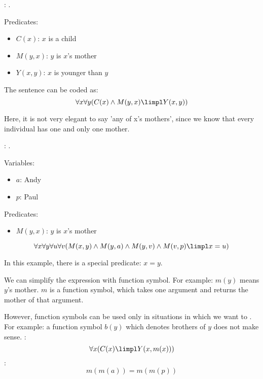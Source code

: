     : .
      \par Predicates:
      \begin{itemize}
        \item $C(x)$: $x$ is a child
        \item $M(y, x)$: $y$ is $x$'s mother
        \item $Y(x, y)$: $x$ is younger than $y$
      \end{itemize}
      \par The sentence can be coded as:
        \[
          \forall x \forall y (C(x) \land M(y, x) \limpl Y(x, y))
        \]
      \par Here, it is not very elegant to say 'any of x’s mothers', since we know that every individual has one and only one mother.

    : .
      \par Variables:
        \begin{itemize}
          \item $a$: Andy
          \item $p$: Paul
        \end{itemize}
      \par Predicates:
        \begin{itemize}
          \item $M(y, x)$: $y$ is $x$'s mother
        \end{itemize}
      \[
        \forall x \forall y \forall u \forall v (M(x, y) \land M(y, a) \land M(y, v) \land M(v, p) \limpl x = u)
      \]
      \par In this example, there is a special predicate: $x = y$.

      \par We can simplify the expression with function symbol. For example: $m(y)$ means $y$'s mother. $m$ is a function symbol, which takes one argument and returns the mother of that argument.
      \par However, function symbols can be used only in situations in which we want to . For example: a function symbol $b(y)$ which denotes brothers of $y$ does not make sense.
      : 
        \[
          \forall x (C(x) \limpl Y(x, m(x)))
        \]
      : 
        \[
          m(m(a)) = m(m(p))
        \]


